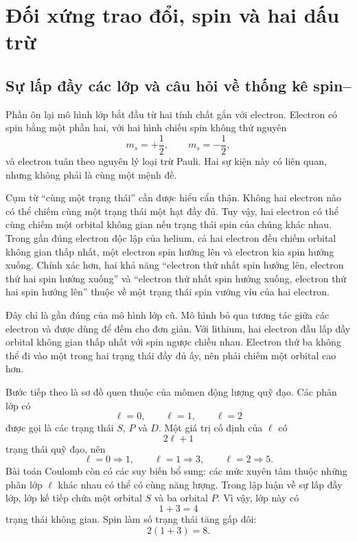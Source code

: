 \chapter{Đối xứng trao đổi, spin và hai dấu trừ}

\section{Sự lấp đầy các lớp và câu hỏi về thống kê spin--}

Phần ôn lại mô hình lớp bắt đầu từ hai tính chất gắn với electron. Electron có spin bằng một phần hai, với hai hình chiếu spin không thứ nguyên
\begin{equation}
m_s=+\frac12,
\qquad
m_s=-\frac12,
\end{equation}
và electron tuân theo nguyên lý loại trừ Pauli. Hai sự kiện này có liên quan, nhưng không phải là cùng một mệnh đề.

Cụm từ ``cùng một trạng thái'' cần được hiểu cẩn thận. Không hai electron nào có thể chiếm cùng một trạng thái một hạt đầy đủ. Tuy vậy, hai electron có thể cùng chiếm một orbital không gian nếu trạng thái spin của chúng khác nhau. Trong gần đúng electron độc lập của helium, cả hai electron đều chiếm orbital không gian thấp nhất, một electron spin hướng lên và electron kia spin hướng xuống. Chính xác hơn, hai khả năng ``electron thứ nhất spin hướng lên, electron thứ hai spin hướng xuống'' và ``electron thứ nhất spin hướng xuống, electron thứ hai spin hướng lên'' thuộc về một trạng thái spin vướng víu của hai electron.

Đây chỉ là gần đúng của mô hình lớp cũ. Mô hình bỏ qua tương tác giữa các electron và được dùng để đếm cho đơn giản. Với lithium, hai electron đầu lấp đầy orbital không gian thấp nhất với spin ngược chiều nhau. Electron thứ ba không thể đi vào một trong hai trạng thái đầy đủ ấy, nên phải chiếm một orbital cao hơn.

Bước tiếp theo là sơ đồ quen thuộc của mômen động lượng quỹ đạo. Các phân lớp có
\begin{equation}
\ell=0,\qquad \ell=1,\qquad \ell=2
\end{equation}
được gọi là các trạng thái \(S\), \(P\) và \(D\). Một giá trị cố định của \(\ell\) có
\begin{equation}
2\ell+1
\end{equation}
trạng thái quỹ đạo, nên
\begin{equation}
\ell=0\Rightarrow 1,
\qquad
\ell=1\Rightarrow 3,
\qquad
\ell=2\Rightarrow 5.
\end{equation}
Bài toán Coulomb còn có các suy biến bổ sung: các mức xuyên tâm thuộc những phân lớp \(\ell\) khác nhau có thể có cùng năng lượng. Trong lập luận về sự lấp đầy lớp, lớp kế tiếp chứa một orbital \(S\) và ba orbital \(P\). Vì vậy, lớp này có
\begin{equation}
1+3=4
\end{equation}
trạng thái không gian. Spin làm số trạng thái tăng gấp đôi:
\begin{equation}
2(1+3)=8.
\end{equation}

